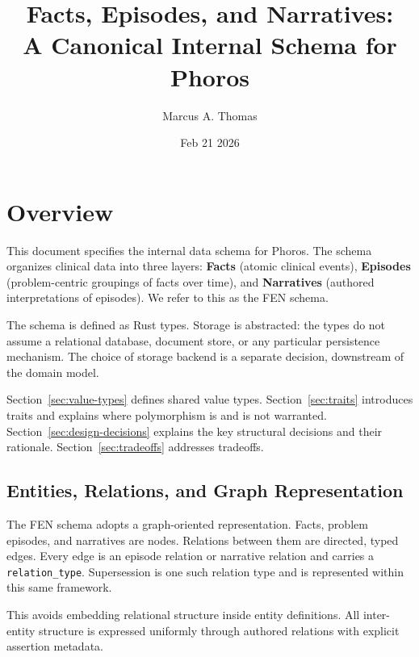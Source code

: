 \documentclass[11pt]{article}
\title{Facts, Episodes, and Narratives:\\
A Canonical Internal Schema for Phoros}
\author{Marcus A. Thomas}
\date{Feb 21 2026}
\begin{document}
\maketitle

\section{Overview}

This document specifies the internal data schema for Phoros. The schema
organizes clinical data into three layers: \textbf{Facts} (atomic clinical
events), \textbf{Episodes} (problem-centric groupings of facts over time),
and \textbf{Narratives} (authored interpretations of episodes). We refer to
this as the FEN schema.

The schema is defined as Rust types. Storage is abstracted: the types do not
assume a relational database, document store, or any particular persistence
mechanism. The choice of storage backend is a separate decision, downstream
of the domain model.

Section~\ref{sec:value-types}
defines shared value types. Section~\ref{sec:traits} introduces traits and
explains where polymorphism is and is not warranted.
Section~\ref{sec:design-decisions} explains the key structural decisions and
their rationale. Section~\ref{sec:tradeoffs} addresses tradeoffs.

\subsection{Entities, Relations, and Graph Representation}

The FEN schema adopts a graph-oriented representation. Facts, problem
episodes, and narratives are nodes. Relations between them are directed,
typed edges. Every edge is an episode relation or narrative relation and
carries a \texttt{relation\_type}. Supersession is one such relation type
and is represented within this same framework.

This avoids embedding relational structure inside entity definitions.
All inter-entity structure is expressed uniformly through authored
relations with explicit assertion metadata.
\end{document}

